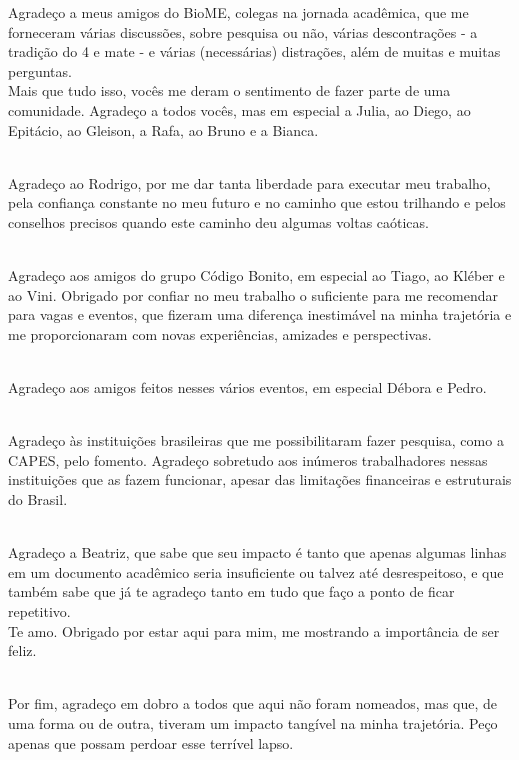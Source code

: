 \documentclass[
	12pt,				%
	oneside,			%
	a4paper,			%
	chapter=TITLE,		%
	section=TITLE,		%
	english,			%
	brazil				%
	]{abntex2}
\begin{document}
\begin{agradecimentos}
	Agradeço a meus amigos do BioME, colegas na jornada acadêmica, que me forneceram várias discussões, sobre pesquisa ou não, várias descontrações - a tradição do 4 e mate - e várias (necessárias) distrações, além de muitas e muitas perguntas.\\
Mais que tudo isso, vocês me deram o sentimento de fazer parte de uma comunidade. Agradeço a todos vocês, mas em especial a Julia, ao Diego, ao Epitácio, ao Gleison, a Rafa, ao Bruno e a Bianca.\\
\strut \\
Agradeço ao Rodrigo, por me dar tanta liberdade para executar meu trabalho, pela confiança constante no meu futuro e no caminho que estou trilhando e pelos conselhos precisos quando este caminho deu algumas voltas caóticas.\\
\strut \\
Agradeço aos amigos do grupo Código Bonito, em especial ao Tiago, ao Kléber e ao Vini. Obrigado por confiar no meu trabalho o suficiente para me recomendar para vagas e eventos, que fizeram uma diferença inestimável na minha trajetória e me proporcionaram com novas experiências, amizades e perspectivas.\\
\strut \\
Agradeço aos amigos feitos nesses vários eventos, em especial Débora e Pedro.\\
\strut \\
Agradeço às instituições brasileiras que me possibilitaram fazer pesquisa, como a CAPES, pelo fomento. Agradeço sobretudo aos inúmeros trabalhadores nessas instituições que as fazem funcionar, apesar das limitações financeiras e estruturais do Brasil.\\
\strut \\
Agradeço a Beatriz, que sabe que seu impacto é tanto que apenas algumas linhas em um documento acadêmico seria insuficiente ou talvez até desrespeitoso, e que também sabe que já te agradeço tanto em tudo que faço a ponto de ficar repetitivo.\\
Te amo. Obrigado por estar aqui para mim, me mostrando a importância de ser feliz.\\
\strut \\
Por fim, agradeço em dobro a todos que aqui não foram nomeados, mas que, de uma forma ou de outra, tiveram um impacto tangível na minha trajetória. Peço apenas que possam perdoar esse terrível lapso.
\end{agradecimentos}
\end{document}

